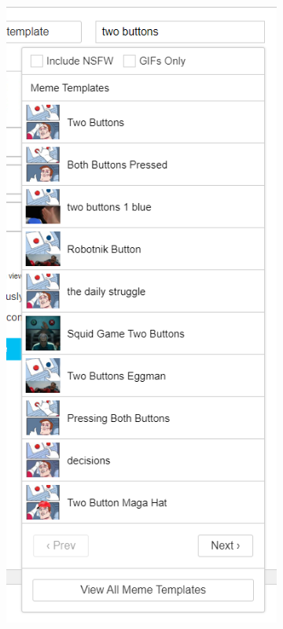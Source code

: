\begin{figure}
\begin{subfigure}{0.3\textwidth}
        \includegraphics[width=\linewidth]{text/img/imgflip/search.png}

\end{subfigure}
\end{figure}

